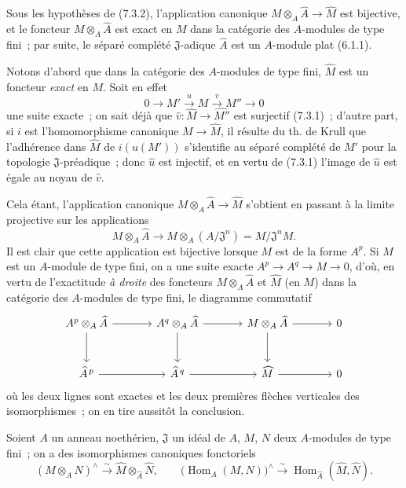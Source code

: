 
\begin{corollary}[7.3.3]
\label{0.7.3.3-fr}
Sous les hypothèses de (7.3.2), l'application canonique
$M\otimes_A\widehat A\to\widehat M$ est bijective, et le foncteur
$M\otimes_A\widehat A$ est exact en $M$ dans la catégorie des $A$-modules de
type fini~; par suite, le séparé complété $\mathfrak J$-adique $\widehat A$
est un $A$-module plat (6.1.1).
\end{corollary}

Notons d'abord que dans la catégorie des $A$-modules de type fini,
$\widehat M$ est un foncteur \emph{exact} en $M$. Soit en effet
\[
  0\to M'\xrightarrow{u}M\xrightarrow{v}M''\to0
\]
une suite exacte~; on sait déjà que
$\widehat v:\widehat M\to\widehat{M''}$ est surjectif (7.3.1)~; d'autre part,
si $i$ est l'homomorphisme canonique $M\to\widehat M$, il résulte du th. de
Krull que l'adhérence dans $\widehat M$ de $i(u(M'))$ s'identifie au séparé
complété de $M'$ pour la topologie $\mathfrak J$-préadique~; donc
$\widehat u$ est injectif, et en vertu de (7.3.1) l'image de $\widehat u$ est
égale au noyau de $\widehat v$.

Cela étant, l'application canonique $M\otimes_A\widehat A\to\widehat M$
s'obtient en passant à la limite projective sur les applications
\[
  M\otimes_A\widehat A\to
  M\otimes_A(A/\mathfrak J^n)=M/\mathfrak J^nM.
\]
Il est clair que cette application est bijective lorsque $M$ est de la forme
$A^p$. Si $M$ est un $A$-module de type fini, on a une suite exacte
$A^p\to A^q\to M\to0$, d'où, en vertu de l'exactitude \emph{à droite} des
foncteurs $M\otimes_A\widehat A$ et $\widehat M$ (en $M$) dans la catégorie
des $A$-modules de type fini, le diagramme commutatif
\[
\begin{tikzcd}[column sep=large,row sep=large]
  A^p\otimes_A\widehat A \arrow[r] \arrow[d] &
  A^q\otimes_A\widehat A \arrow[r] \arrow[d] &
  M\otimes_A\widehat A \arrow[r] \arrow[d] &
  0 \\
  \widehat A^{\,p} \arrow[r] &
  \widehat A^{\,q} \arrow[r] &
  \widehat M \arrow[r] &
  0
\end{tikzcd}
\]
où les deux lignes sont exactes et les deux premières flèches verticales des
isomorphismes~; on en tire aussitôt la conclusion.

\begin{corollary}[7.3.4]
\label{0.7.3.4-fr}
Soient $A$ un anneau noethérien, $\mathfrak J$ un idéal de $A$, $M$, $N$ deux
$A$-modules de type fini~; on a des isomorphismes canoniques fonctoriels
\[
  (M\otimes_A N)^\wedge
  \xrightarrow{\sim}
  \widehat M\otimes_{\widehat A}\widehat N,
  \qquad
  \bigl(\operatorname{Hom}_A(M,N)\bigr)^\wedge
  \xrightarrow{\sim}
  \operatorname{Hom}_{\widehat A}(\widehat M,\widehat N).
\]
\end{corollary}


